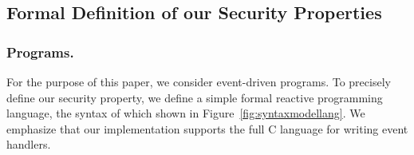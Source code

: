 
\setcounter{lemma}{0}

\subsection{Formal Definition of our Security Properties}
\label{sec:secprops}

\subsubsection{Programs.}
\label{language}
%
For the purpose of this paper, we consider event-driven programs. To
precisely define our security property, we define a simple formal reactive
programming language, the syntax of which shown in
Figure~\ref{fig:syntaxmodellang}. We emphasize that our implementation
supports the full C language for writing event handlers.

